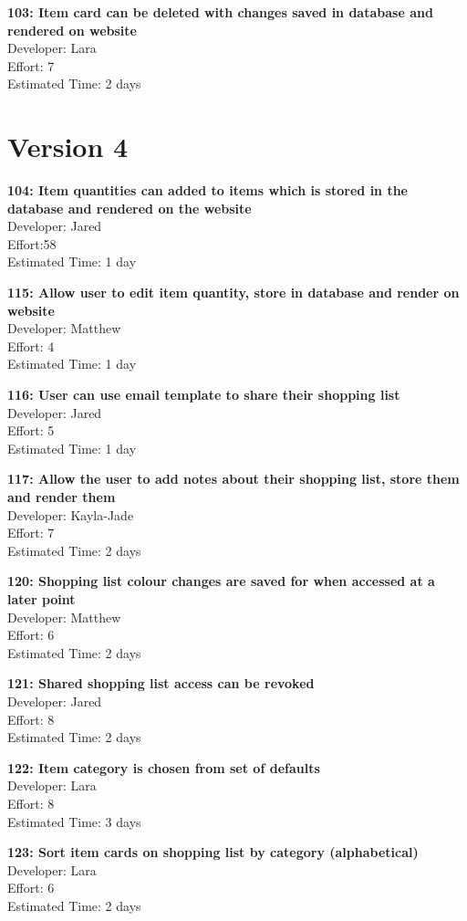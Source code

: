 \documentclass[10pt,onecolumn]{witseiepaper}
\begin{document}
\textbf{103: Item card can be deleted with changes saved in database and rendered on website} \\
Developer: Lara\\
Effort: 7\\
Estimated Time: 2 days

\section*{Version 4}

\textbf{104: Item quantities can added to items which is stored in the database and rendered on the website} \\
Developer: Jared\\
Effort:58\\
Estimated Time: 1 day

\textbf{115: Allow user to edit item quantity, store in database and render on website} \\
Developer: Matthew\\
Effort: 4\\
Estimated Time: 1 day

\textbf{116: User can use email template to share their shopping list} \\
Developer: Jared\\
Effort: 5\\
Estimated Time: 1 day
%

\textbf{117: Allow the user to add notes about their shopping list, store them and render them} \\
Developer: Kayla-Jade\\
Effort: 7\\
Estimated Time: 2 days

\textbf{120: Shopping list colour changes are saved for when accessed at a later point} \\
Developer: Matthew\\
Effort: 6\\
Estimated Time: 2 days

\textbf{121: Shared shopping list access can be revoked} \\
Developer: Jared\\
Effort: 8\\
Estimated Time: 2 days

\textbf{122: Item category is chosen from set of defaults} \\
Developer: Lara\\
Effort: 8\\
Estimated Time: 3 days

\textbf{123: Sort item cards on shopping list by category (alphabetical)} \\
Developer: Lara\\
Effort: 6\\
Estimated Time: 2 days
\end{document}
